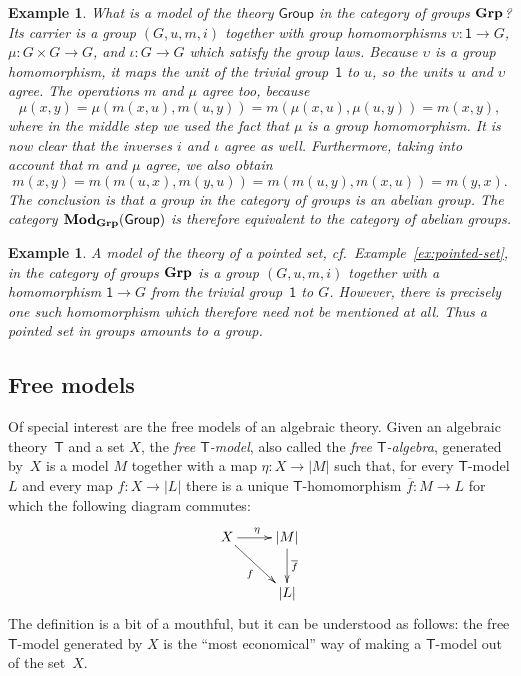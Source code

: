 \documentclass{amsart}
\newcommand{\theory}[1]{\mathsf{#1}} %
\newcommand{\ModC}[2]{\text{\textbf{Mod}}_{#1}(\theory{#2})} %
\newcommand{\category}[1]{\text{\textbf{#1}}} %
\newcommand{\carrier}[1]{|#1|} %
\newcommand{\one}{\mathsf{1}} %
\newtheorem{example}[definition]{Example}
\begin{document}
\begin{example}
  What is a model of the theory $\theory{Group}$ in the category of groups $\category{Grp}$? Its
  carrier is a group $(G, u, m, i)$ together with group homomorphisms
  $\upsilon : \one \to G$, $\mu : G \times G \to G$, and $\iota : G \to G$ which satisfy
  the group laws. Because $\upsilon$ is a group homomorphism, it maps the unit of the
  trivial group~$\one$ to $u$, so the units $u$ and $\upsilon$ agree. The operations $m$
  and $\mu$ agree too, because
  \begin{equation*}
    \mu(x, y) =
    \mu(m(x, u), m(u, y)) =
    m(\mu(x, u), \mu(u, y)) =
    m(x, y),
  \end{equation*}
  where in the middle step we used the fact that $\mu$ is a group homomorphism. It is now
  clear that the inverses $i$ and $\iota$ agree as well. Furthermore, taking into account
  that $m$ and $\mu$ agree, we also obtain
  \begin{equation*}
    m(x, y) =
    m(m(u, x), m(y, u)) =
    m(m(u, y), m(x, u)) =
    m(y, x).
  \end{equation*}
  The conclusion is that a group in the category of groups is an abelian group. The
  category $\ModC{\category{Grp}}{Group}$ is therefore equivalent to the category of abelian groups.
\end{example}

\begin{example}
  A model of the theory of a pointed set, cf.\ Example~\ref{ex:pointed-set}, in the
  category of groups $\category{Grp}$ is a group $(G, u, m, i)$ together with a
  homomorphism $\one \to G$ from the trivial group~$\one$ to $G$. However, there is
  precisely one such homomorphism which therefore need not be mentioned at all. Thus a
  pointed set in groups amounts to a group.
\end{example}


\subsection{Free models}
\label{sec:free-models}

Of special interest are the free models of an algebraic theory. Given an
algebraic theory~$\theory{T}$ and a set $X$, the \emph{free $\theory{T}$-model},
also called the \emph{free $\theory{T}$-algebra}, generated by~$X$ is a model
$M$ together with a map $\eta : X \to \carrier{M}$ such that, for every
$\theory{T}$-model $L$ and every map $f : X \to \carrier{L}$ there is a unique
$\theory{T}$-homomorphism $\overline{f} : M \to L$ for which the following
diagram commutes:
%
\begin{equation*}
  \xymatrix{
    {X}
    \ar[r]^{\eta}
    \ar[rd]_{f}
    &
    {\carrier{M}}
    \ar[d]^{\overline{f}}
    \\
    &
     \carrier{L}
  }
\end{equation*}
%
The definition is a bit of a mouthful, but it can be understood as follows: the
free $\theory{T}$-model generated by $X$ is the ``most economical'' way of
making a $\theory{T}$-model out of the set~$X$.
\end{document}
